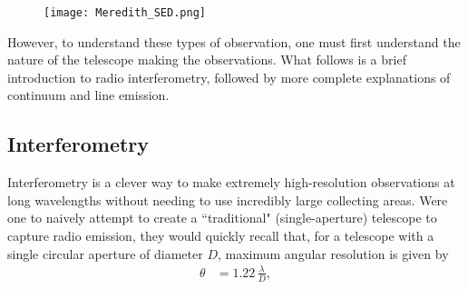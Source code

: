 \begin{figure}
\centering
  \texttt{[image: Meredith\_SED.png]}
  \label{fig:SED}
\end{figure}


However, to understand these types of observation, one must first understand the nature of the telescope making the observations. What follows is a brief introduction to radio interferometry, followed by more complete explanations of continuum and line emission.



\subsection{Interferometry}
\label{section:interferometry}
Interferometry is a clever way to make extremely high-resolution observations at long wavelengths without needing to use incredibly large collecting areas. Were one to naively attempt to create a ``traditional" (single-aperture) telescope to capture radio emission, they would quickly recall that, for a telescope with a single circular aperture of diameter $D$, maximum angular resolution is given by
\begin{align}
  \theta &= 1.22 \, \frac{\lambda}{D},
\end{align}

